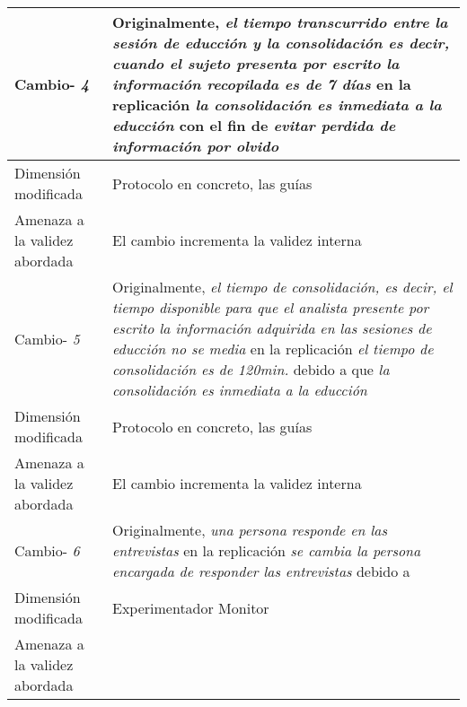 \begin{table}
\begin{tabular}{| p{3.3cm} | p{9cm} |}
Cambio- \textit{4}   & \parbox[t]{9cm} {Originalmente,  \textit{el tiempo transcurrido entre la sesión de educción y la consolidación es decir, cuando el sujeto presenta por escrito la información recopilada es de 7 días} } \parbox[t]{9cm}{en la replicación \textit{la consolidación es inmediata a la educción} } con el fin de \textit{evitar perdida de información por olvido } \\  \hline
Dimensión modificada & 
 Protocolo en concreto, las guías     \\  \hline 
Amenaza a la validez abordada  & El cambio incrementa la validez  interna  \\  \hline \hline

Cambio- \textit{5}   & \parbox[t]{9cm} {Originalmente,  \textit{el tiempo de consolidación, es decir, el tiempo disponible para que el analista presente por escrito la información adquirida en las sesiones de educción no se media} } \parbox[t]{9cm}{en la replicación \textit{el tiempo de consolidación es de 120min. } } debido a que \textit{la consolidación es inmediata a la educción} \\  \hline
Dimensión modificada & 
 Protocolo en concreto, las guías     \\  \hline 
Amenaza a la validez abordada  & El cambio incrementa la validez  interna  \\  \hline \hline

Cambio- \textit{6}   & \parbox[t]{9cm} {Originalmente,  \textit{ una persona responde en las entrevistas } } \parbox[t]{9cm}{en la replicación \textit{ se cambia la persona encargada de responder las entrevistas} } debido a  \textit{} \\  \hline
Dimensión modificada & 
 Experimentador Monitor    \\  \hline 
Amenaza a la validez abordada  &    \\  \hline

\end{tabular}
\label{tab:Ale-2011}
\end{table}



